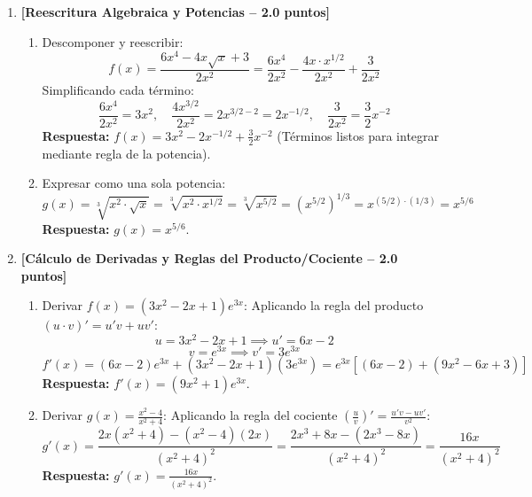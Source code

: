 \documentclass[11pt,a4paper]{article}
\begin{document}
\begin{enumerate}[leftmargin=*,itemsep=16pt,label=\textbf{Ejercicio \arabic*.}]

    \item \textbf{[Reescritura Algebraica y Potencias -- 2.0 puntos]}
    \begin{enumerate}[label=\alph*),itemsep=8pt]
        \item Descomponer y reescribir:
        \[
        f(x) = \frac{6x^4 - 4x\sqrt{x} + 3}{2x^2} = \frac{6x^4}{2x^2} - \frac{4x \cdot x^{1/2}}{2x^2} + \frac{3}{2x^2}
        \]
        Simplificando cada término:
        \[
        \frac{6x^4}{2x^2} = 3x^2, \quad \frac{4x^{3/2}}{2x^2} = 2x^{3/2 - 2} = 2x^{-1/2}, \quad \frac{3}{2x^2} = \frac{3}{2}x^{-2}
        \]
        {\color{respcolor}\textbf{Respuesta:}} $\displaystyle f(x) = 3x^2 - 2x^{-1/2} + \frac{3}{2}x^{-2}$ \quad (Términos listos para integrar mediante regla de la potencia).
        
        \item Expresar como una sola potencia:
        \[
        g(x) = \sqrt[3]{x^2 \cdot \sqrt{x}} = \sqrt[3]{x^2 \cdot x^{1/2}} = \sqrt[3]{x^{5/2}} = \left(x^{5/2}\right)^{1/3} = x^{(5/2) \cdot (1/3)} = x^{5/6}
        \]
        {\color{respcolor}\textbf{Respuesta:}} $\displaystyle g(x) = x^{5/6}$.
    \end{enumerate}

    \item \textbf{[Cálculo de Derivadas y Reglas del Producto/Cociente -- 2.0 puntos]}
    \begin{enumerate}[label=\alph*),itemsep=8pt]
        \item Derivar $f(x) = (3x^2 - 2x + 1)e^{3x}$:
        Aplicando la regla del producto $(u \cdot v)' = u'v + uv'$:
        \[
        u = 3x^2 - 2x + 1 \implies u' = 6x - 2
        \]
        \[
        v = e^{3x} \implies v' = 3e^{3x}
        \]
        \[
        f'(x) = (6x - 2)e^{3x} + (3x^2 - 2x + 1)(3e^{3x}) = e^{3x}\left[ (6x - 2) + (9x^2 - 6x + 3) \right]
        \]
        {\color{respcolor}\textbf{Respuesta:}} $\displaystyle f'(x) = (9x^2 + 1)e^{3x}$.

        \item Derivar $g(x) = \frac{x^2 - 4}{x^2 + 4}$:
        Aplicando la regla del cociente $\left(\frac{u}{v}\right)' = \frac{u'v - uv'}{v^2}$:
        \[
        g'(x) = \frac{2x(x^2 + 4) - (x^2 - 4)(2x)}{(x^2 + 4)^2} = \frac{2x^3 + 8x - (2x^3 - 8x)}{(x^2 + 4)^2} = \frac{16x}{(x^2 + 4)^2}
        \]
        {\color{respcolor}\textbf{Respuesta:}} $\displaystyle g'(x) = \frac{16x}{(x^2 + 4)^2}$.
    \end{enumerate}


\end{enumerate}
\end{document}
